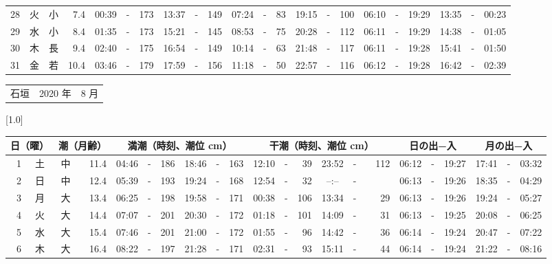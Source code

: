 \documentclass[12pt,a4j]{jsarticle}
\begin{document}
\begin{table}[htbp]
\begin{center}
{\begin{tabular}{|rc|cr|ccrccr|ccrccr|ccc|ccc|}
28 & 火 & 小 &  7.4 &  00:39 &-& 173 &  13:37 &-& 149 &  07:24 &-&  83 &  19:15 &-& 100 & 06:10 & -& 19:29 & 13:35 & -& 00:23 \\
29 & 水 & 小 &  8.4 &  01:35 &-& 173 &  15:21 &-& 145 &  08:53 &-&  75 &  20:28 &-& 112 & 06:11 & -& 19:29 & 14:38 & -& 01:05 \\
30 & 木 & 長 &  9.4 &  02:40 &-& 175 &  16:54 &-& 149 &  10:14 &-&  63 &  21:48 &-& 117 & 06:11 & -& 19:28 & 15:41 & -& 01:50 \\
31 & 金 & 若 & 10.4 &  03:46 &-& 179 &  17:59 &-& 156 &  11:18 &-&  50 &  22:57 &-& 116 & 06:12 & -& 19:28 & 16:42 & -& 02:39 \\
   \hline
   \end{tabular}}
   \end{center}
\end{table}
\newpage
 \begin{table}[htbp]
 \begin{center}
 \begin{tabular}{lcc}
 \LARGE{石垣}  & \large{2020 年} & \large{ 8 月} \\
 \end{tabular}
 \end{center}
 \begin{center}
    \scalebox{0.7}[1.0]{
    \begin{tabular}{|rc|cr|ccrccr|ccrccr|ccc|ccc|}
    \hline
    \multicolumn{2}{|c|}{日（曜）} & \multicolumn{2}{c|}{潮（月齢）} & \multicolumn{6}{c|}{満潮（時刻、潮位 cm）} & \multicolumn{6}{c|}{干潮（時刻、潮位 cm）} & \multicolumn{3}{c|}{日の出−入} &  \multicolumn{3}{c|}{月の出−入}\\
 \hline
 1 & 土 & 中 & 11.4 &  04:46 &-& 186 &  18:46 &-& 163 &  12:10 &-&  39 &  23:52 &-& 112 & 06:12 & -& 19:27 & 17:41 & -& 03:32 \\
 2 & 日 & 中 & 12.4 &  05:39 &-& 193 &  19:24 &-& 168 &  12:54 &-&  32 &  --:-- &-&~~~~~ & 06:13 & -& 19:26 & 18:35 & -& 04:29 \\
 3 & 月 & 大 & 13.4 &  06:25 &-& 198 &  19:58 &-& 171 &  00:38 &-& 106 &  13:34 &-&  29 & 06:13 & -& 19:26 & 19:24 & -& 05:27 \\
 4 & 火 & 大 & 14.4 &  07:07 &-& 201 &  20:30 &-& 172 &  01:18 &-& 101 &  14:09 &-&  31 & 06:13 & -& 19:25 & 20:08 & -& 06:25 \\
 5 & 水 & 大 & 15.4 &  07:46 &-& 201 &  21:00 &-& 172 &  01:55 &-&  96 &  14:42 &-&  36 & 06:14 & -& 19:24 & 20:47 & -& 07:22 \\
 6 & 木 & 大 & 16.4 &  08:22 &-& 197 &  21:28 &-& 171 &  02:31 &-&  93 &  15:11 &-&  44 & 06:14 & -& 19:24 & 21:22 & -& 08:16 \\

\end{tabular}}
\end{center}
\end{table}
\end{document}

